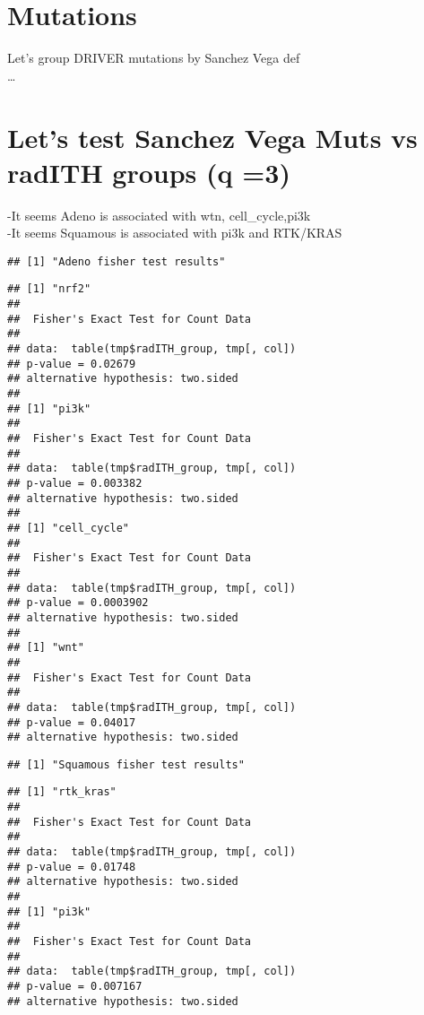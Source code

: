 \documentclass[]{article}
\begin{document}
\section{Mutations}\label{mutations}

Let's group DRIVER mutations by Sanchez Vega def\\
\ldots{}

\section{Let's test Sanchez Vega Muts vs radITH groups (q
=3)}\label{lets-test-sanchez-vega-muts-vs-radith-groups-q-3}

-It seems Adeno is associated with wtn, cell\_cycle,pi3k\\
-It seems Squamous is associated with pi3k and RTK/KRAS\\

\begin{verbatim}
## [1] "Adeno fisher test results"
\end{verbatim}

\begin{verbatim}
## [1] "nrf2"
## 
##  Fisher's Exact Test for Count Data
## 
## data:  table(tmp$radITH_group, tmp[, col])
## p-value = 0.02679
## alternative hypothesis: two.sided
## 
## [1] "pi3k"
## 
##  Fisher's Exact Test for Count Data
## 
## data:  table(tmp$radITH_group, tmp[, col])
## p-value = 0.003382
## alternative hypothesis: two.sided
## 
## [1] "cell_cycle"
## 
##  Fisher's Exact Test for Count Data
## 
## data:  table(tmp$radITH_group, tmp[, col])
## p-value = 0.0003902
## alternative hypothesis: two.sided
## 
## [1] "wnt"
## 
##  Fisher's Exact Test for Count Data
## 
## data:  table(tmp$radITH_group, tmp[, col])
## p-value = 0.04017
## alternative hypothesis: two.sided
\end{verbatim}

\begin{verbatim}
## [1] "Squamous fisher test results"
\end{verbatim}

\begin{verbatim}
## [1] "rtk_kras"
## 
##  Fisher's Exact Test for Count Data
## 
## data:  table(tmp$radITH_group, tmp[, col])
## p-value = 0.01748
## alternative hypothesis: two.sided
## 
## [1] "pi3k"
## 
##  Fisher's Exact Test for Count Data
## 
## data:  table(tmp$radITH_group, tmp[, col])
## p-value = 0.007167
## alternative hypothesis: two.sided
\end{verbatim}
\end{document}
